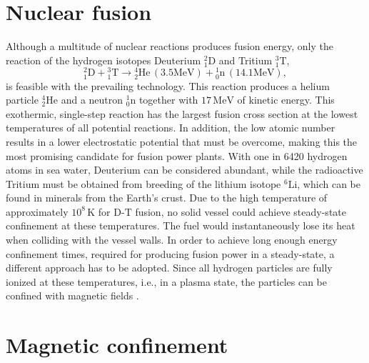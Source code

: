 \section{Nuclear fusion}
Although a multitude of nuclear reactions produces fusion energy, only the reaction of the hydrogen isotopes Deuterium ${}_1^2\mathrm{D}$ and Tritium ${}_1^3\mathrm{T}$,
\begin{equation}
	{}_1^2\mathrm{D} + {}_1^3\mathrm{T} \rightarrow {}_2^4\mathrm{He}\,(3.5 \textrm{MeV}) + {}_0^1\textrm{n} \,(14.1 \textrm{MeV}),
\end{equation}
 is feasible with the prevailing technology. This reaction produces a helium particle ${}_2^4\mathrm{He}$ and a neutron ${}_0^1\textrm{n}$ together with $17 \,\textrm{MeV}$ of kinetic energy. This exothermic, single-step reaction has the largest fusion cross section at the lowest temperatures of all potential reactions. In addition, the low atomic number results in a lower electrostatic potential that must be overcome, making this the most promising candidate for fusion power plants. With one in 6420 hydrogen atoms in sea water, Deuterium can be considered abundant, while the radioactive Tritium must be obtained from breeding of the lithium isotope  ${}^6\mathrm{Li}$, which can be found in minerals from the Earth's crust. Due to the high temperature of approximately $10^8\, \mathrm{K}$ for $\mathrm{D}$-$\mathrm{T}$ fusion, no solid vessel could achieve steady-state confinement at these temperatures. The fuel would instantaneously lose its heat when colliding with the vessel walls. In order to achieve long enough energy confinement times, required for producing fusion power in a steady-state, a different approach has to be adopted. Since all hydrogen particles are fully ionized at these temperatures, i.e., in a plasma state, the particles can be confined with magnetic fields \cite{freidberg2008plasma}.

\section{Magnetic confinement}

